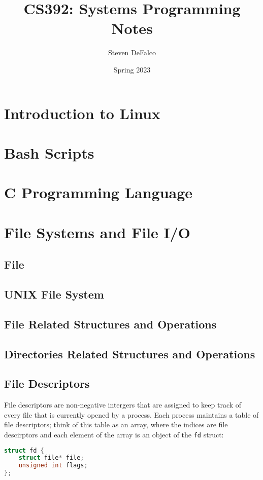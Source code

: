 \documentclass{article}
\title{CS392: Systems Programming Notes}
\author{Steven DeFalco}
\date{Spring 2023}
\newcommand{\code}[1]{\texttt{#1}}
\begin{document}
\maketitle
\tableofcontents
\newpage


\section{Introduction to Linux}
\section{Bash Scripts}
\section{C Programming Language}

\newpage
\section{File Systems and File I/O}

\subsection{File}
\subsection{UNIX File System}
\subsection{File Related Structures and Operations}
\subsection{Directories Related Structures and Operations}

\subsection{File Descriptors}

File descriptors are non-negative intergers that are assigned to keep track of every file that is currently opened by a process. Each process maintains a table of file descriptors; think of this table as an array, where the indices are file descirptors and each element of the array is an object of the \code{fd} struct: \\ 

\begin{lstlisting}[language=C]
struct fd {
    struct file* file;
    unsigned int flags;
};
\end{lstlisting} 
\end{document}
